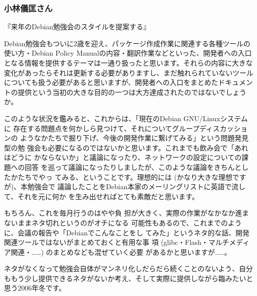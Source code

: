 \documentclass[cjk,dvipdfmx]{beamer}
\begin{document}
\begin{frame}
 
 \frametitle{小林儀匡さん}

 『来年のDebian勉強会のスタイルを提案する』

 Debian勉強会もついに2歳を迎え、パッケージ作成作業に関連する各種ツールの
 使い方・Debian Policy Manualの内容・翻訳作業などといった、開発者への入口
 となる情報を提供するテーマは一通り扱ったと思います。それらの内容に大きな
 変化があったらそれは更新する必要がありますし、まだ触れられていないツール
 についても扱う必要があると思いますが、開発者への入口をまとめたドキュメン
 トの提供という当初の大きな目的の一つは大方達成されたのではないでしょうか。
\end{frame}
\begin{frame}
 
 このような状況を鑑みると、これからは、「現在のDebian GNU/Linuxシステムに
 存在する問題点を何かしら見つけて、それについてグループディスカッションの
 ようなかたちで掘り下げ、今後の開発作業に繋げてみる」という問題発見型の勉
 強会も必要になるのではないかと思います。これまでも飲み会で「あれはどうに
 かならないか」と議論になったり、ネットワークの設定についての課題への回答
 を巡って議論になったりしましたが、このような議論をきちんとしたかたちでやっ
 てみる、ということです。理想的には (かなり大きな理想ですが)、本勉強会で
 議論したことをDebian本家のメーリングリストに英語で流して、それを元に何か
 を生み出せればとても素敵だと思います。\end{frame}

\begin{frame}

もちろん、これを毎月行うのはやや負
 担が大きく、実際の作業がなかなか進まないままネタ切れというのがオチになる
 可能性もあるので、これまでのように、会議の報告や「Debianでこんなことをし
 てみた」というネタ的な話、開発関連ツールではないがまとめておくと有用な事
 項 (glibc・Flash・マルチメディア関連・……) のまとめなども混ぜていく必要
 があるかと思いますが……。

  ネタがなくなって勉強会自体がマンネリ化しだらだら続くことのないよう、自分
 ももう少し提供できるネタがないか考え、そして実際に提供しながら臨みたいと
 思う2006年冬です。
\end{frame}
\end{document}
